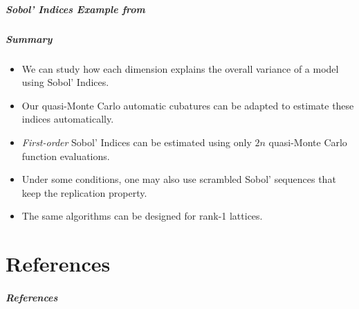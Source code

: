 \documentclass[11pt,compress]{beamer} %
\newcommand{\tol}{\text{tol}}
\begin{document}
	\begin{frame}
\frametitle{Sobol' Indices Example from }
\vspace{-4ex}


\end{frame}

\begin{frame}
\frametitle{Summary}
\begin{itemize}
\item We can study how each \alert{dimension explains the overall variance} of a model using \alert{Sobol' Indices}.
\item Our \alert{quasi-Monte Carlo automatic cubatures} can be adapted to estimate these indices automatically.
\item \alert{\emph{First-order} Sobol' Indices} can be estimated using only \alert{$2n$ quasi-Monte Carlo} function evaluations.
\item Under some conditions, one may also use \alert{scrambled} Sobol' sequences that keep the \alert{replication property}.
\item The same algorithms can be designed for \alert{rank-1 lattices}.
\end{itemize}
\end{frame}

\part{References}
\begin{frame}[allowframebreaks]\frametitle{References}
\nocite{*}

\end{frame}
\end{document}
